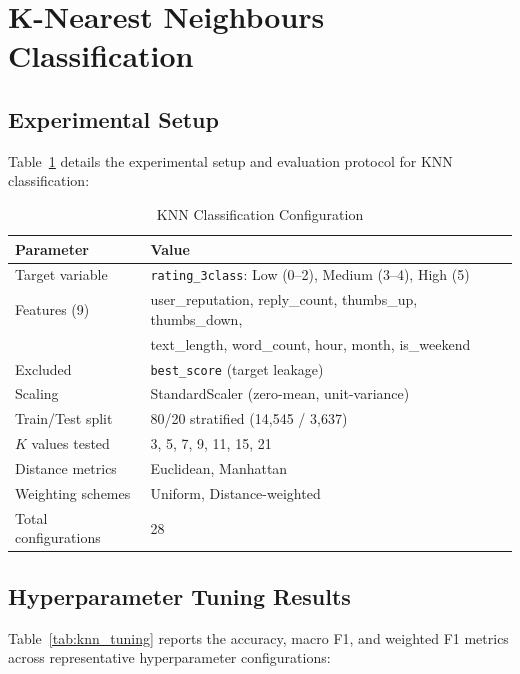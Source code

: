\documentclass[12pt,a4paper]{article}
\begin{document}
\section{K-Nearest Neighbours Classification}

\subsection{Experimental Setup}

Table~\ref{tab:knn_config} details the experimental setup and evaluation protocol for KNN classification:

\begin{table}[H]
\centering
\caption{KNN Classification Configuration}
\label{tab:knn_config}
\begin{tabular}{l l}
\toprule
\textbf{Parameter} & \textbf{Value} \\
\midrule
Target variable & \texttt{rating\_3class}: Low (0--2), Medium (3--4), High (5) \\
Features (9) & user\_reputation, reply\_count, thumbs\_up, thumbs\_down, \\
             & text\_length, word\_count, hour, month, is\_weekend \\
Excluded & \texttt{best\_score} (target leakage) \\
Scaling & StandardScaler (zero-mean, unit-variance) \\
Train/Test split & 80/20 stratified (14{,}545 / 3{,}637) \\
$K$ values tested & 3, 5, 7, 9, 11, 15, 21 \\
Distance metrics & Euclidean, Manhattan \\
Weighting schemes & Uniform, Distance-weighted \\
Total configurations & 28 \\
\bottomrule
\end{tabular}
\end{table}

\subsection{Hyperparameter Tuning Results}

Table~\ref{tab:knn_tuning} reports the accuracy, macro F1, and weighted F1 metrics across representative hyperparameter configurations:
\end{document}
